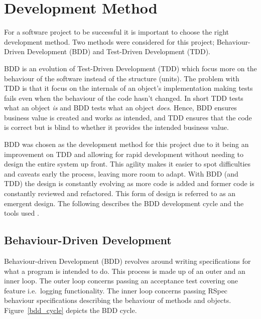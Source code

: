 \section{Development Method} %
\label{sec:development}

For a software project to be successful it is important to choose the right
development method. Two methods were considered for this project;
Behaviour-Driven Development (BDD) and Test-Driven Development (TDD).

BDD is an evolution of Test-Driven Development (TDD) which focus more on the
behaviour of the software instead of the structure (units). The problem with
TDD is that it focus on the internals of an object's implementation making
tests fails even when the behaviour of the code hasn't changed. In short TDD
tests what an object \textit{is} and BDD tests what an object
\textit{does}\cite{rspecbook}. Hence, BDD ensures business value is created and
works as intended, and TDD ensures that the code is correct but is blind to
whether it provides the intended business value.

BDD was chosen as the development method for this project due to it being an
improvement on TDD and allowing for rapid development without needing to
design the entire system up front. This agility makes it easier to spot
difficulties and caveats early the process, leaving more room to adapt. With
BDD (and TDD) the design is constantly evolving as more code is added and
former code is constantly reviewed and refactored. This form of design is
referred to as an emergent design. The following describes the BDD development
cycle and the tools used \cite{bddintro}.

\subsection{Behaviour-Driven Development}
Behaviour-driven Development (BDD) revolves around writing specifications for
what a program is intended to do. This process is made up of an outer and an
inner loop. The outer loop concerns passing an acceptance test covering one
feature i.e.\ logging functionality. The inner loop concerns passing RSpec
behaviour specifications describing the behaviour of methods and objects.
Figure~\ref{bdd_cycle} depicts the BDD cycle.

